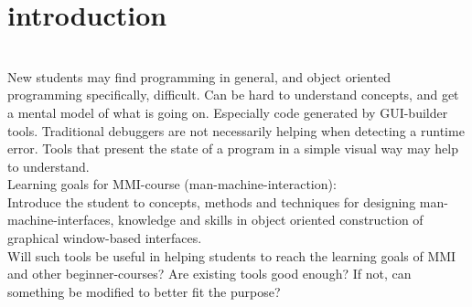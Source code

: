 \section{introduction}\label{introduction}
~\\
New students may find programming in general, and object oriented programming specifically, difficult.
Can be hard to understand concepts, and get a mental model of what is going on.
Especially code generated by GUI-builder tools.
Traditional debuggers are not necessarily helping when detecting a runtime error.
Tools that present the state of a program in a simple visual way may help to understand.
~\\

Learning goals for MMI-course (man-machine-interaction):\\
Introduce the student to concepts, methods and techniques for designing man-machine-interfaces, knowledge and skills in object oriented construction of graphical window-based interfaces.
~\\

Will such tools be useful in helping students to reach the learning goals of MMI and other beginner-courses?
Are existing tools good enough?
If not, can something be modified to better fit the purpose?